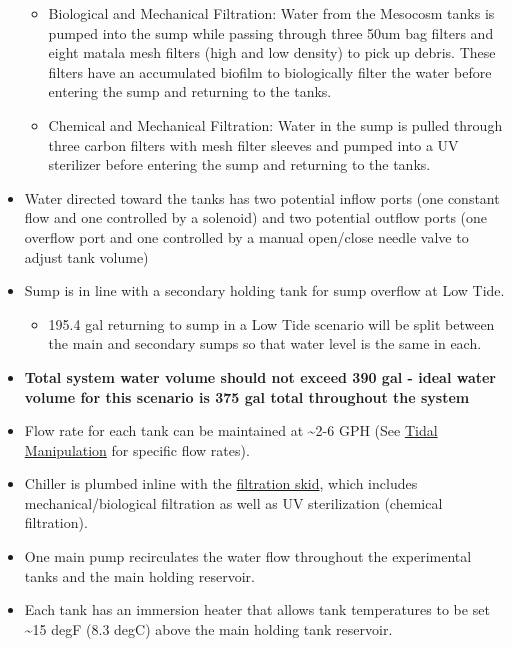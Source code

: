 \documentclass[
]{book}
\providecommand{\tightlist}{%
  \setlength{\itemsep}{0pt}\setlength{\parskip}{0pt}}
\begin{document}
\begin{itemize}
  \begin{itemize}
  \tightlist
  \item
    Biological and Mechanical Filtration: Water from the Mesocosm tanks is pumped into the sump while passing through three 50um bag filters and eight matala mesh filters (high and low density) to pick up debris. These filters have an accumulated biofilm to biologically filter the water before entering the sump and returning to the tanks.
  \item
    Chemical and Mechanical Filtration: Water in the sump is pulled through three carbon filters with mesh filter sleeves and pumped into a UV sterilizer before entering the sump and returning to the tanks.\\
  \end{itemize}
\item
  Water directed toward the tanks has two potential inflow ports (one constant flow and one controlled by a solenoid) and two potential outflow ports (one overflow port and one controlled by a manual open/close needle valve to adjust tank volume)\\
\item
  Sump is in line with a secondary holding tank for sump overflow at Low Tide.

  \begin{itemize}
  \tightlist
  \item
    195.4 gal returning to sump in a Low Tide scenario will be split between the main and secondary sumps so that water level is the same in each.\\
  \end{itemize}
\item
  \textbf{Total system water volume should not exceed 390 gal - ideal water volume for this scenario is 375 gal total throughout the system}
\item
  Flow rate for each tank can be maintained at \textasciitilde2-6 GPH (See \href{07-tidal_manipulation.md}{Tidal Manipulation} for specific flow rates).\\
\item
  Chiller is plumbed inline with the \href{https://github.com/SilbigerLab/Mesocosm_User_Manual/blob/master/Manuals/Filtration_Skid_Build_Package.pdf}{filtration skid}, which includes mechanical/biological filtration as well as UV sterilization (chemical filtration).\\
\item
  One main pump recirculates the water flow throughout the experimental tanks and the main holding reservoir.\\
\item
  Each tank has an immersion heater that allows tank temperatures to be set \textasciitilde15 degF (8.3 degC) above the main holding tank reservoir.


\end{itemize}
\end{document}
